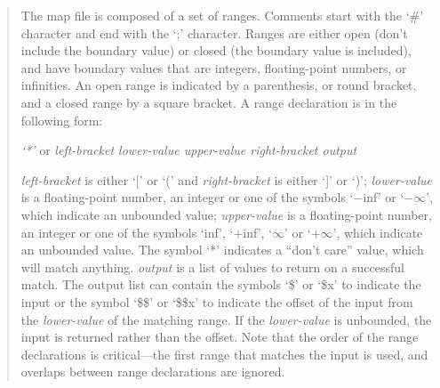\begin{quote}
The map file is composed of a set of ranges.
Comments start with the `\#' character and end with the `;' character.
Ranges are either open (don't include the boundary value) or closed (the boundary value is included),
and have boundary values that are integers, floating-point numbers, or infinities.
An open range is indicated by a parenthesis, or round bracket, and a closed range by a square bracket.
A range declaration is in the following form:

\centerline{\emph{`*'} or \emph{left-bracket lower-value upper-value right-bracket output}}

\emph{left-bracket} is either `[' or `(' and \emph{right-bracket} is either `]' or `)';
\emph{lower-value} is a floating-point number, an integer or one of the symbols `$-$inf' or
`$-\infty$', which indicate an unbounded value;
\emph{upper-value} is a floating-point number, an integer or one of the symbols
`inf', `$+$inf', `$\infty$' or `$+\infty$', which indicate an unbounded value.
The symbol `*' indicates a ``don't care'' value, which will match anything.
\emph{output} is a list of values to return on a successful match.
The output list can contain the symbols `\$' or `\$x' to indicate the input or the symbol `\$\$'
or `\$\$x' to indicate the offset of the input from the \emph{lower-value} of the matching range.
If the \emph{lower-value} is unbounded, the input is returned rather than the offset.
Note that the order of the range declarations is critical---the first range that matches the input
is used, and overlaps between range declarations are ignored.
\end{quote}

\objItemMessage

\objItemComments


